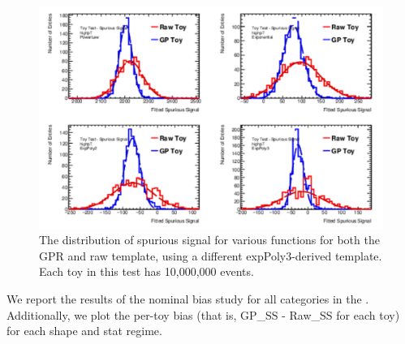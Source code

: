 \begin{figure} 
\begin{center}
  \includegraphics[width=\textwidth]{figures/background/gpr/validation/nominal/ToyTest_FitSigVals_highpT_10M_noSig}   
\caption{The distribution of spurious signal for various functions for both the GPR and raw template, using a different expPoly3-derived template. Each toy in this test has 10,000,000 events.}
\label{fig:highpt_10M_noSig}
\end{center}
\end{figure}

We report the results of the nominal bias study for all categories in the \Tab{\ref{tab:NoSigSS}}. Additionally, we plot the per-toy bias (that is, GP\_SS - Raw\_SS for each toy) for each shape and stat regime.

